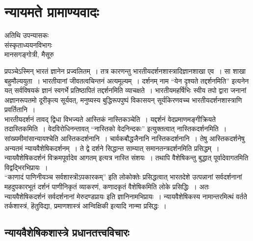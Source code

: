 {\fontsize{15}{17}\selectfont
\presetvalues
\chapter{न्यायमते प्रामाण्यवादः}

\begin{center}
\smallskip
अतिथि उपन्यासकः\\
संस्कृताध्ययनविभागः\\
मानसगङ्गोत्री, मैसूरु 
 
\addrule
\end{center}
प्रपञ्चेऽस्मिन् भारतं ज्ञानेन प्रज्वलितम्~। तत्र कारणन्तु भारतीयदर्शनशास्त्रादिज्ञानशाखा एव~। सा शाखा बहुमौल्ययुता~। भारतीयानां जीवतत्वचिन्तनं अत्यमूल्यम्~। दर्शनम् नाम “येन दृश्यते तद्दर्शनमिति” इत्यनेन यत् सर्वविषयकं ज्ञानं स्वगर्भे प्रतिष्ठापितं तद्दर्शनमिति व्याचक्षते~। भारतीयमहर्षिभिः स्वीय तपो द्वारा जनानां अज्ञानरूपतमो दूरीकृत्य सूर्यवत्, मनुष्यस्य बुद्धिरूपपुष्पं विकासयन् सूर्यकिरणवच्च भारतीयदर्शनशास्त्राणि प्रवर्तितानि~। 
~\\[0.2cm]
भारतीयदर्शनं तावद् द्विधा विभज्यते आस्तिकं नास्तिकञ्चेति~। यद्दर्शनं वेदप्रमाण\-मङ्गीक्रियते तदास्तिकमिति~। वेदविरोधिनन्तावत् “नास्तिको वेदनिन्दकः” इत्युक्तत्वात् नास्तिकदर्शनमिति~। सांख्यमीमांसान्यायश्चेति आस्तिकदर्शनानि~। चार्वकबौद्धजैनानि नास्तिकदर्शनानि~। तेषु आस्तिकदर्शनेषु अन्यतमं न्यायवैशेषिकदर्शनम्~। ते द्वे दर्शने सिद्धान्त साम्यात् समानतन्त्रदर्शनमिति प्रसिद्धम्~। न्यायवैशेषिकदर्शनं विक्रमपूर्वादेव आगतम् इत्यत्र नास्ति संशयः~। तथापि वैशेषिकन्तु बुद्धात् पूर्वादेवागतमिति विद्वद्भिरभिप्रायः~। 
~\\[0.2cm]
“काणादं पाणिनीयञ्च सर्वशास्त्रॊऽपकारकम्” इति लोकोक्तेः प्रसिद्धत्वात् भारतदेशे उत्पन्नानां सर्वदर्शनानां महदुपकारभूतं दर्शनं पाणीनिकृतं व्याकरणं, कणादकृतं वैशेषिकमिति लोके प्रसिद्धिः~। अतः न्यायवैशेषिकदर्शनं सर्वदर्शनानां मेरुदण्डप्रायः इति ज्ञानिनामभिप्रायः~। न्यायवैशेषिकस्य नामान्तरमित्थं वर्तते तर्कशास्त्रं, हॆतुविद्या, प्रमाणशास्त्रं आन्विक्षिकी इत्यादि नान्मा प्रसिद्धः~। 

\section*{न्यायवैशेषिकशास्त्रे प्रधानतत्त्वविचारः}

}
